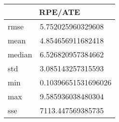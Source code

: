 \begin{table}[!ht] 
 \centering 
 \begin{tabular}{|l|l|} \hline 
 \multicolumn{2}{|c|}{RPE/ATE} \\ \hline 
 rmse & 5.752025960329608 \\ \hline 
mean & 4.854656911682418 \\ \hline 
median & 6.526820957384662 \\ \hline 
std & 3.085143257315593 \\ \hline 
min & 0.10396651531696026 \\ \hline 
max & 9.585936038480304 \\ \hline 
sse & 7113.447569385735 \\ \hline 
\end{tabular} 
 \end{table}